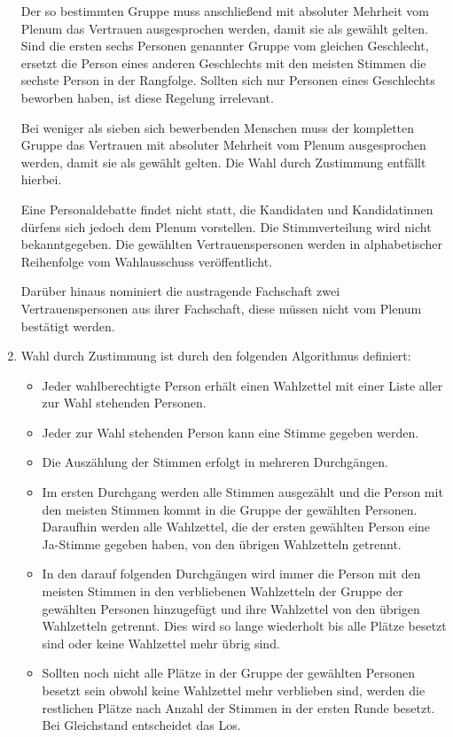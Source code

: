 \documentclass[draft,12pt,oneside]{scrreprt}
\begin{document}
\begin{enumerate}
        Der so bestimmten Gruppe muss anschließend mit absoluter Mehrheit vom
        Plenum das Vertrauen ausgesprochen werden, damit sie als gewählt gelten.
        Sind die ersten sechs Personen genannter Gruppe vom gleichen Geschlecht,
        ersetzt die Person eines anderen Geschlechts mit den meisten Stimmen die
        sechste Person in der Rangfolge.
        Sollten sich nur Personen eines Geschlechts beworben haben, ist diese
        Regelung irrelevant.

        Bei weniger als sieben sich bewerbenden Menschen muss der kompletten Gruppe
        das Vertrauen mit absoluter Mehrheit vom Plenum ausgesprochen werden,
        damit sie als gewählt gelten.
        Die Wahl durch Zustimmung entfällt hierbei.

        Eine Personaldebatte findet nicht statt, die Kandidaten und Kandidatinnen
        dürfens sich jedoch dem Plenum vorstellen.
        Die Stimmverteilung wird nicht bekanntgegeben.
        Die gewählten Vertrauenspersonen werden in alphabetischer Reihenfolge
        vom Wahlausschuss veröffentlicht.

        Darüber hinaus nominiert die austragende Fachschaft zwei Vertrauenspersonen
        aus ihrer Fachschaft, diese müssen nicht vom Plenum bestätigt werden.

  \item Wahl durch Zustimmung ist durch den folgenden Algorithmus definiert:
        \begin{itemize}
        \item Jeder wahlberechtigte Person erhält einen Wahlzettel mit einer
              Liste aller zur Wahl stehenden Personen.
        \item Jeder zur Wahl stehenden Person kann eine Stimme gegeben werden.
        \item Die Auszählung der Stimmen erfolgt in mehreren Durchgängen.
        \item Im ersten Durchgang werden alle Stimmen ausgezählt und die Person
              mit den meisten Stimmen kommt in die Gruppe der gewählten Personen.
              Daraufhin werden alle Wahlzettel, die der ersten gewählten Person
              eine Ja-Stimme gegeben haben, von den übrigen Wahlzetteln getrennt.
        \item In den darauf folgenden Durchgängen wird immer die Person mit den
              meisten Stimmen in den verbliebenen Wahlzetteln der Gruppe der gewählten
              Personen hinzugefügt und ihre Wahlzettel von den übrigen Wahlzetteln
              getrennt. Dies wird so lange wiederholt bis alle Plätze besetzt sind
              oder keine Wahlzettel mehr übrig sind.
        \item Sollten noch nicht alle Plätze in der Gruppe der gewählten Personen
              besetzt sein obwohl keine Wahlzettel mehr verblieben sind, werden
              die restlichen Plätze nach Anzahl der Stimmen in der ersten Runde
              besetzt. Bei Gleichstand entscheidet das Los.
        \end{itemize}


\end{enumerate}
\end{document}
